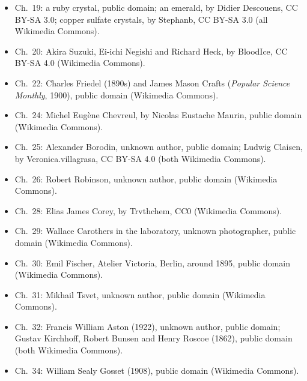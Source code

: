 \begin{itemize}
        Werner, Les Prix Nobel (1914), public domain (both Wikimedia Commons).
  \item Ch.~19: a ruby crystal, public domain; an emerald, by Didier Descouens,
        CC BY-SA 3.0; copper sulfate crystals, by Stephanb, CC BY-SA 3.0 (all
        Wikimedia Commons).
  \item Ch.~20: Akira Suzuki, Ei-ichi Negishi and Richard Heck, by BloodIce, CC BY-SA
        4.0 (Wikimedia Commons).
  \item Ch.~22: Charles Friedel (1890s) and James Mason Crafts (\textit{Popular
        Science Monthly}, 1900), public domain (Wikimedia Commons).
  \item Ch.~24: Michel Eug\`ene Chevreul, by Nicolas Eustache Maurin, public domain
        (Wikimedia Commons).
  \item Ch.~25: Alexander Borodin, unknown author, public domain; Ludwig Claisen, by
        Veronica.villagrasa, CC BY-SA 4.0 (both Wikimedia Commons).
  \item Ch.~26: Robert Robinson, unknown author, public domain (Wikimedia Commons).
  \item Ch.~28: Elias James Corey, by Trvthchem, CC0 (Wikimedia Commons).
  \item Ch.~29: Wallace Carothers in the laboratory, unknown photographer, public domain
        (Wikimedia Commons).
  \item Ch.~30: Emil Fischer, Atelier Victoria, Berlin, around 1895, public domain (Wikimedia
        Commons).
  \item Ch.~31: Mikhail Tsvet, unknown author, public domain (Wikimedia Commons).
  \item Ch.~32: Francis William Aston (1922), unknown author, public domain; Gustav Kirchhoff,
        Robert Bunsen and Henry Roscoe (1862), public domain (both Wikimedia Commons).
  \item Ch.~34: William Sealy Gosset (1908), public domain (Wikimedia Commons).
\end{itemize}
\clearpage
